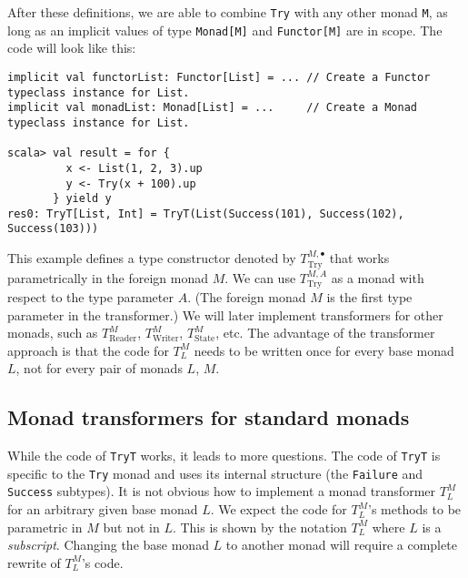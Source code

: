  After these definitions, we are able to combine \lstinline!Try!
with any other monad \lstinline!M!, as long as an implicit values
of type \lstinline!Monad[M]! and \lstinline!Functor[M]! are in scope.
The code will look like this:
\begin{lstlisting}
implicit val functorList: Functor[List] = ... // Create a Functor typeclass instance for List.
implicit val monadList: Monad[List] = ...     // Create a Monad typeclass instance for List.

scala> val result = for {
         x <- List(1, 2, 3).up
         y <- Try(x + 100).up
       } yield y
res0: TryT[List, Int] = TryT(List(Success(101), Success(102), Success(103)))
\end{lstlisting}

This example defines a type constructor denoted by $T_{\text{Try}}^{M,\bullet}$
that works parametrically in the foreign monad $M$. We can use $T_{\text{Try}}^{M,A}$
as a monad with respect to the type parameter $A$. (The foreign monad
$M$ is the first type parameter in the transformer.) We will later
implement transformers for other monads, such as $T_{\text{Reader}}^{M}$,
$T_{\text{Writer}}^{M}$, $T_{\text{State}}^{M}$, etc. The advantage
of the transformer approach is that the code for $T_{L}^{M}$ needs
to be written once for every base monad $L$, not for every pair of
monads $L$, $M$.

\subsection{Monad transformers for standard monads\label{subsec:Monad-transformers-for-standard-monads}}

While the code of \lstinline!TryT! works, it leads to more questions.
The code of \lstinline!TryT! is specific to the \lstinline!Try!
monad and uses its internal structure (the \lstinline!Failure! and
\lstinline!Success! subtypes). It is not obvious how to implement
a monad transformer $T_{L}^{M}$ for an arbitrary given base monad
$L$. We expect the code for $T_{L}^{M}$\textsf{'}s methods to be parametric
in $M$ but not in $L$. This is shown by the notation $T_{L}^{M}$
where $L$ is a \emph{subscript}. Changing the base monad $L$ to
another monad will require a complete rewrite of $T_{L}^{M}$\textsf{'}s code.

